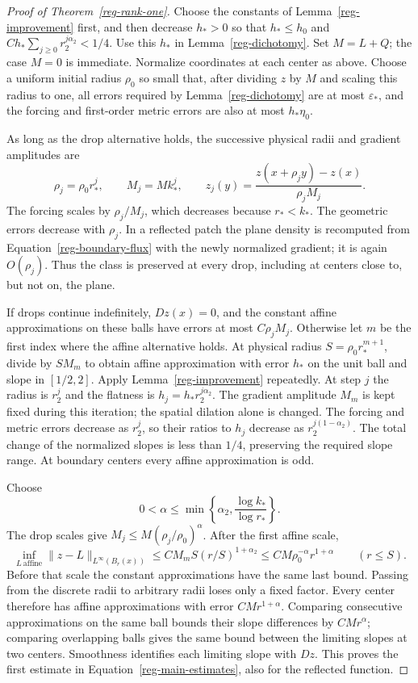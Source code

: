 \begin{proof}[Proof of Theorem~\ref{reg-rank-one}]
Choose the constants of Lemma~\ref{reg-improvement} first, and
then decrease $h_*>0$ so that $h_*\le h_0$ and
$Ch_*\sum_{j\ge0}r_2^{j\alpha_2}<1/4$. Use this $h_*$ in
Lemma~\ref{reg-dichotomy}. Set $M=L+Q$; the case $M=0$ is
immediate. Normalize coordinates at each center as above. Choose
a uniform initial radius $\rho_0$ so small that, after dividing
$z$ by $M$ and scaling this radius to one, all errors required by
Lemma~\ref{reg-dichotomy} are at most $\varepsilon_*$, and the
forcing and first-order metric errors are also at most $h_*\eta_0$.

As long as the drop alternative holds, the successive physical
radii and gradient amplitudes are
\begin{equation}
 \rho_j=\rho_0r_*^j,
 \qquad M_j=Mk_*^j,
 \qquad
 z_j(y)=\frac{z(x+\rho_jy)-z(x)}{\rho_j M_j}.
 \label{reg-drop-scales}
\end{equation}
The forcing scales by $\rho_j/M_j$, which decreases because
$r_*<k_*$. The geometric errors decrease with $\rho_j$.
In a reflected patch the plane density is recomputed from
Equation~\eqref{reg-boundary-flux} with the newly normalized
gradient; it is again $O(\rho_j)$. Thus the class is preserved
at every drop, including at centers close to, but not on, the plane.

If drops continue indefinitely, $Dz(x)=0$, and the constant
affine approximations on these balls have errors at most
$C\rho_jM_j$. Otherwise let $m$ be the first index where the
affine alternative holds. At physical radius
$S=\rho_0r_*^{m+1}$, divide by $SM_m$ to obtain affine
approximation with error $h_*$ on the unit ball and slope in
$[1/2,2]$. Apply Lemma~\ref{reg-improvement} repeatedly. At step
$j$ the radius is $r_2^j$ and the flatness is
$h_j=h_*r_2^{j\alpha_2}$. The gradient amplitude $M_m$ is kept
fixed during this iteration; the spatial dilation alone is changed.
The forcing and metric errors decrease as $r_2^j$, so their ratios
to $h_j$ decrease as $r_2^{j(1-\alpha_2)}$. The total change of
the normalized slopes is less than $1/4$, preserving the required
slope range. At boundary centers every affine approximation is odd.

Choose
\[
 0<\alpha\le\min\left\{\alpha_2,
                           \frac{\log k_*}{\log r_*}\right\}.
\]
The drop scales give $M_j\le M(\rho_j/\rho_0)^\alpha$.
After the first affine scale,
\[
 \inf_{L\ \mathrm{affine}}
       \|z-L\|_{L^\infty(B_r(x))}
 \le C M_mS(r/S)^{1+\alpha_2}
 \le CM\rho_0^{-\alpha}r^{1+\alpha}\qquad(r\le S).
\]
Before that scale the constant approximations have the same last
bound. Passing from the discrete radii to arbitrary radii loses
only a fixed factor. Every center therefore has affine
approximations with error $CMr^{1+\alpha}$. Comparing consecutive
approximations on the same ball bounds their slope differences by
$CMr^\alpha$; comparing overlapping balls gives the same bound
between the limiting slopes at two centers. Smoothness identifies
each limiting slope with $Dz$. This proves the first estimate in
Equation~\eqref{reg-main-estimates}, also for the reflected function.


\end{proof}
